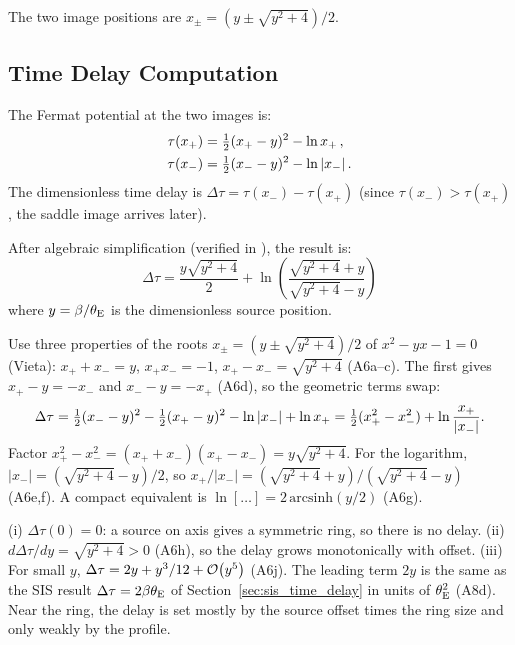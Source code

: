 The two image positions are $x_\pm = (y \pm \sqrt{y^2 + 4})/2$.

\subsection{Time Delay Computation}

The Fermat potential at the two images is:
\begin{align}
    \tau(x_+) &= \tfrac{1}{2}(x_+ - y)^2 - \ln x_+ \,, \\
    \tau(x_-) &= \tfrac{1}{2}(x_- - y)^2 - \ln|x_-| \,.
\end{align}
The dimensionless time delay is $\Delta\tau = \tau(x_-) - \tau(x_+)$
(since $\tau(x_-) > \tau(x_+)$, the saddle image arrives later).

After algebraic simplification (verified in
),
the result is:
\begin{equation}
    \boxed{
    \Delta\tau = \frac{y\sqrt{y^2 + 4}}{2}
    + \ln\!\left(\frac{\sqrt{y^2 + 4} + y}{\sqrt{y^2 + 4} - y}\right)
    }
    \label{eq:delta_tau_point_mass}
\end{equation}
where $y = \beta / \theta_{\mathrm{E}}$ is the dimensionless source position.

\begin{derivation}
Use three properties of the roots $x_\pm = (y\pm\sqrt{y^2+4})/2$ of
$x^2-yx-1=0$ (Vieta): $x_++x_-=y$, $x_+x_-=-1$, $x_+-x_-=\sqrt{y^2+4}$
(A6a--c).  The first gives $x_+-y=-x_-$ and $x_--y=-x_+$ (A6d), so the
geometric terms swap:
\[
  \Delta\tau = \tfrac{1}{2}(x_--y)^2-\tfrac{1}{2}(x_+-y)^2-\ln|x_-|+\ln x_+
  = \tfrac{1}{2}(x_+^2-x_-^2)+\ln\frac{x_+}{|x_-|}.
\]
Factor $x_+^2-x_-^2 = (x_++x_-)(x_+-x_-) = y\sqrt{y^2+4}$.  For the logarithm,
$|x_-| = (\sqrt{y^2+4}-y)/2$, so
$x_+/|x_-| = (\sqrt{y^2+4}+y)/(\sqrt{y^2+4}-y)$ (A6e,f).  A compact equivalent
is $\ln[\ldots] = 2\,\mathrm{arcsinh}(y/2)$ (A6g).
\end{derivation}

\begin{annotation}
(i) $\Delta\tau(0)=0$: a source on axis gives a symmetric ring, so there is no delay.
(ii) $d\Delta\tau/dy = \sqrt{y^2+4}>0$ (A6h), so the delay grows monotonically
with offset.  (iii) For small $y$, $\Delta\tau = 2y+y^3/12+\mathcal{O}\!\left(y^5\right)$ (A6j).
The leading term $2y$ is the same as the SIS result $\Delta\tau = 2\beta\theta_{\mathrm{E}}$
of Section~\ref{sec:sis_time_delay} in units of $\theta_{\mathrm{E}}^2$ (A8d).  Near the
ring, the delay is set mostly by the source offset times the ring size and
only weakly by the profile.
\end{annotation}


